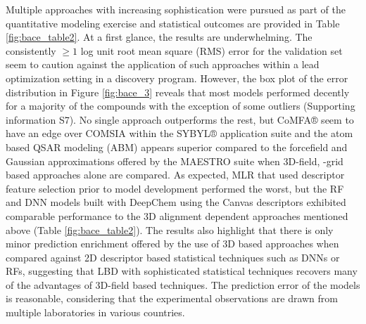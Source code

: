 Multiple approaches with increasing sophistication were pursued as part of the quantitative modeling exercise and statistical outcomes are provided in Table \ref{fig:bace_table2}.  At a first glance, the results are underwhelming.  The consistently $ \geq 1$ log unit root mean square (RMS) error for the validation set seem to caution against the application of such approaches within a lead optimization setting in a discovery program.  However, the box plot of the error distribution in Figure \ref{fig:bace_3} reveals that most models performed decently for a majority of the compounds with the exception of some outliers (Supporting information S7).  No single approach outperforms the rest, but CoMFA® seem to have an edge over COMSIA within the SYBYL® application suite and the atom based QSAR modeling (ABM) appears superior compared to the forcefield and Gaussian approximations offered by the MAESTRO suite when 3D-field, -grid based approaches alone are compared.  As expected, MLR that used descriptor feature selection prior to model development performed the worst, but the RF and DNN models built with DeepChem using the Canvas descriptors exhibited comparable performance to the 3D alignment dependent approaches mentioned above (Table \ref{fig:bace_table2}).  The results also highlight that there is only minor prediction enrichment offered by the use of 3D based approaches when compared against 2D descriptor based statistical techniques such as DNNs or RFs, suggesting that LBD with sophisticated statistical techniques recovers many of the advantages of 3D-field based techniques.  The prediction error of the models is reasonable, considering that the experimental observations are drawn from multiple laboratories in various countries.

